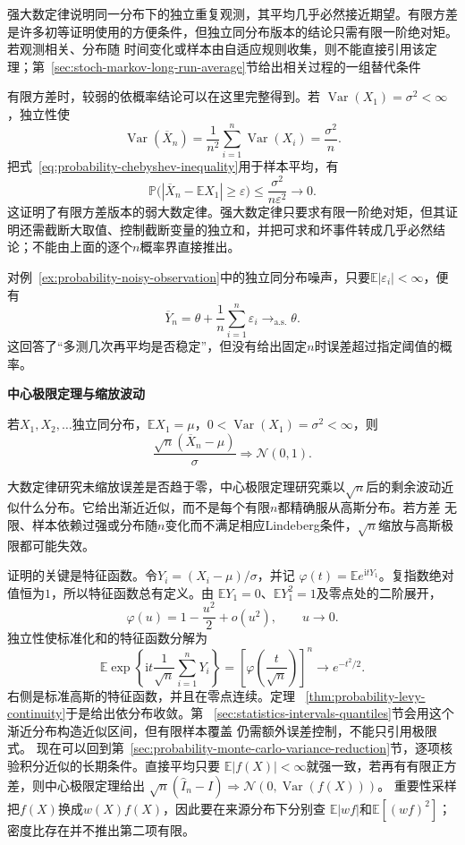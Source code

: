 强大数定律说明同一分布下的独立重复观测，其平均几乎必然接近期望。有限方差是许多初等证明使用的方便条件，但独立同分布版本的结论只需有限一阶绝对矩。若观测相关、分布随
时间变化或样本由自适应规则收集，则不能直接引用该定理；第~\ref{sec:stoch-markov-long-run-average}节给出相关过程的一组替代条件

有限方差时，较弱的依概率结论可以在这里完整得到。若
\(\operatorname{Var}(X_1)=\sigma^2<\infty\)，独立性使
\[
  \operatorname{Var}(\overline{X}_n)
  =\frac{1}{n^2}\sum_{i=1}^{n}\operatorname{Var}(X_i)
  =\frac{\sigma^2}{n}.
\]
把式~\eqref{eq:probability-chebyshev-inequality}用于样本平均，有
\[
  \mathbb{P}\bigl(
    |\overline{X}_n-\mathbb{E}X_1|\geq\varepsilon
  \bigr)
  \leq\frac{\sigma^2}{n\varepsilon^2}\to0.
\]
这证明了有限方差版本的弱大数定律。强大数定律只要求有限一阶绝对矩，但其证明还需截断大取值、控制截断变量的独立和，并把可求和坏事件转成几乎必然结论；不能由上面的逐个\(n\)概率界直接推出。

对例~\ref{ex:probability-noisy-observation}中的独立同分布噪声，只要\(\mathbb{E}|\varepsilon_i|<\infty\)，便有
\[ \overline{Y}_n
  =\theta+\frac{1}{n}\sum_{i=1}^{n}\varepsilon_i\to_{\mathrm{a.s.}}\theta. \]
这回答了“多测几次再平均是否稳定”，但没有给出固定\(n\)时误差超过指定阈值的概率。

\par\medskip\noindent\textbf{中心极限定理与缩放波动}\quad
\begin{theorem}
\label{thm:probability-iid-central-limit}
若\(X_1,X_2,\ldots\)独立同分布，\(\mathbb{E}X_1=\mu\)，\(0<\operatorname{Var}(X_1)=\sigma^2<\infty\)，则
\[ \frac{\sqrt{n}(\overline{X}_n-\mu)}{\sigma}
  \Rightarrow\mathcal{N}(0,1). \]
\end{theorem}

大数定律研究未缩放误差是否趋于零，中心极限定理研究乘以\(\sqrt{n}\)后的剩余波动近似什么分布。它给出渐近近似，而不是每个有限\(n\)都精确服从高斯分布。若方差
无限、样本依赖过强或分布随\(n\)变化而不满足相应Lindeberg条件，\(\sqrt{n}\)缩放与高斯极限都可能失效。

证明的关键是特征函数。令\(Y_i=(X_i-\mu)/\sigma\)，并记
\(\varphi(t)=\mathbb{E}e^{\mathrm{i}tY_1}\)。复指数绝对值恒为\(1\)，所以特征函数总有定义。由
\(\mathbb{E}Y_1=0\)、\(\mathbb{E}Y_1^2=1\)及零点处的二阶展开，
\[
  \varphi(u)=1-\frac{u^2}{2}+o(u^2),
  \qquad u\to0.
\]
独立性使标准化和的特征函数分解为
\[
  \mathbb{E}\exp\left\{
    \mathrm{i}t\frac{1}{\sqrt n}\sum_{i=1}^{n}Y_i
  \right\}
  =
  \left[\varphi\left(\frac{t}{\sqrt n}\right)\right]^n
  \longrightarrow e^{-t^2/2}.
\]
右侧是标准高斯的特征函数，并且在零点连续。定理
~\ref{thm:probability-levy-continuity}于是给出依分布收敛。第
~\ref{sec:statistics-intervals-quantiles}节会用这个渐近分布构造近似区间，但有限样本覆盖
仍需额外误差控制，不能只引用极限式。
现在可以回到第~\ref{sec:probability-monte-carlo-variance-reduction}节，逐项核验积分近似的长期条件。直接平均只要
\(\mathbb E|f(X)|<\infty\)就强一致，若再有有限正方差，则中心极限定理给出
\(\sqrt n(\widehat I_n-I)\Rightarrow\mathcal N(0,\operatorname{Var}(f(X)))\)。
重要性采样把\(f(X)\)换成\(w(X)f(X)\)，因此要在来源分布下分别查
\(\mathbb E|wf|\)和\(\mathbb E[(wf)^2]\)；密度比存在并不推出第二项有限。

